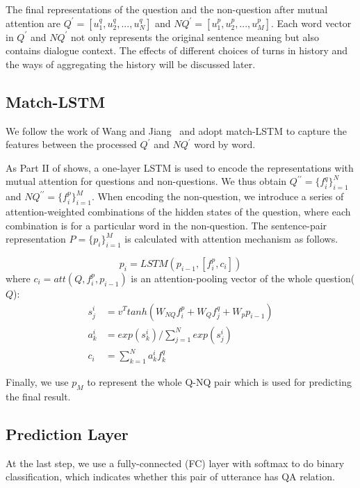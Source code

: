 The final representations of the question and the non-question after
mutual attention are $Q^\prime=[u^q_1,u^q_2,...,u^q_N]$ and 
$NQ^\prime=[u^p_1,u^p_2,...,u^p_M]$. Each word vector
in $Q^\prime$ and $NQ^\prime$ not only represents the original sentence meaning 
but also contains dialogue context. The effects of 
different choices of turns in history and the ways of aggregating the 
history will be discussed later.


\subsection{Match-LSTM}
We follow the work of Wang and Jiang~ 
and adopt match-LSTM to capture the features between the 
processed $Q^\prime$ and $NQ^\prime$ word by word.

As Part II of  shows,
a one-layer LSTM is used to encode the representations with mutual attention for 
questions and non-questions. 
We thus obtain $Q^{\prime\prime}=\{f^q_i\}_{i=1}^{N}$ and 
$NQ^{\prime\prime}=\{f^p_i\}_{i=1}^{M}$. 
When encoding the non-question, we introduce a series of attention-weighted 
combinations of the hidden states of the question, where each combination is for a particular word in the non-question. The sentence-pair representation $P=\{p_i\}_{i=1}^{M}$ is calculated with attention mechanism as follows. 

\begin{equation}
    p_i=LSTM(p_{i-1},[f^p_i,c_i])
\end{equation}
where $c_i=att(Q,f^p_i,p_{i-1})$ is an attention-pooling vector of the whole question($Q$):
\begin{equation}
\begin{aligned}
s^i_j&=v^Ttanh(W_{NQ}f^p_i+W_Qf^q_j+W_pp_{i-1})\\
a^i_k&=exp(s^i_k)/\sum_{j=1}^Nexp(s^i_j)\\
c_i&=\sum_{k=1}^Na^i_kf^q_k
\end{aligned}
\end{equation}

Finally, we use $p_M$ to represent the whole Q-NQ pair which is used for predicting the final result.

\subsection{Prediction Layer }
At the last step, we use a fully-connected (FC) layer with softmax to do binary classification, which indicates whether this pair of utterance has QA relation.

